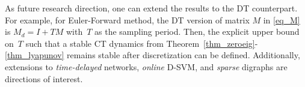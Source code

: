 \documentclass[letterpaper, 10pt, conference]{ieeeconf}
\begin{document}
As future research direction, one can extend the results to the DT counterpart. 
For example, for Euler-Forward method, the DT version of matrix $M$ in \eqref{eq_M} is $M_d = I+TM$ with~$T$ as the sampling period. Then, the explicit upper bound on~$T$ such that a stable CT dynamics from Theorem~\ref{thm_zeroeig}-\ref{thm_lyapunov} remains stable after discretization can be defined. Additionally, extensions to \textit{time-delayed} networks, \textit{online} D-SVM, and \textit{sparse} digraphs are directions of interest.




\end{document}
